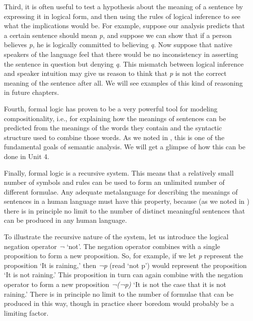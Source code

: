 Third, it is often useful to test a hypothesis about the meaning of a sentence by expressing it in logical form, and then using the rules of logical inference to see what the implications would be. For example, suppose our analysis predicts that a certain sentence should mean \textit{p}, and suppose we can show that if a person believes \textit{p}, he is logically committed to believing \textit{q}. Now suppose that native speakers of the language feel that there would be no inconsistency in asserting the sentence in question but denying \textit{q}. This mismatch between logical inference and speaker intuition may give us reason to think that \textit{p} is not the correct meaning of the sentence after all. We will see examples of this kind of reasoning in future chapters.



Fourth, formal logic has proven to be a very powerful tool for modeling compositionality, i.e., for explaining how the meanings of sentences can be predicted from the meanings of the words they contain and the syntactic structure used to combine those words. As we noted in , this is one of the fundamental goals of semantic analysis. We will get a glimpse of how this can be done in Unit 4.



Finally, formal logic is a recursive system. This means that a relatively small number of symbols and rules can be used to form an unlimited number of different formulae. Any adequate metalanguage for describing the meanings of sentences in a human language must have this property, because (as we noted in ) there is in principle no limit to the number of distinct meaningful sentences that can be produced in any human language.



To illustrate the recursive nature of the system, let us introduce the logical negation operator \textit{¬} ‘not’. The negation operator combines with a single proposition to form a new proposition. So, for example, if we let \textit{p} represent the proposition ‘It is raining,’ then \textit{¬p} (read ‘not p’) would represent the proposition ‘It is not raining.’ This proposition in turn can again combine with the negation operator to form a new proposition \textit{¬(¬p)} ‘It is not the case that it is not raining.’ There is in principle no limit to the number of formulae that can be produced in this way, though in practice sheer boredom would probably be a limiting factor.




